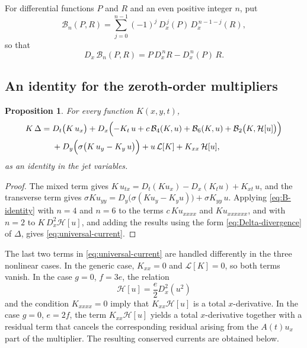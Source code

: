 \documentclass[11pt]{article}
\numberwithin{equation}{section}
\newtheorem{proposition}[theorem]{Proposition}
\theoremstyle{definition}
\theoremstyle{remark}
\begin{document}
For differential functions $P$ and $R$
and an even positive integer $n$, put
\begin{equation}
\mathcal{B}_n(P,R)
= \sum_{j=0}^{n-1} (-1)^j\,D_x^{\,j}(P)\,D_x^{\,n-1-j}(R),
\label{eq:B-def}
\end{equation}
so that
\begin{equation}
D_x\,\mathcal{B}_n(P,R)
=
P\,D_x^{\,n}R-D_x^{\,n}(P)\,R.
\label{eq:B-identity}
\end{equation}

\subsection{An identity for the zeroth-order multipliers}

\begin{proposition}
\label{prop:universal-current}
For every function $K(x,y,t)$,
\begin{equation}
\begin{aligned}
K\,\Delta
= {}& D_t\bigl(K\,u_x\bigr)
+ D_x\Bigl(
-K_t\,u
+ c\,\mathcal{B}_4(K,u)
+ \mathcal{B}_6(K,u)
+ \mathcal{B}_2\bigl(K,\mathcal{H}[u]\bigr)
\Bigr)
\\
&+ D_y\Bigl(\sigma\bigl(K\,u_y - K_y\,u\bigr)\Bigr)
+ u\,\mathcal{L}[K]
+ K_{xx}\,\mathcal{H}[u],
\end{aligned}
\label{eq:universal-current}
\end{equation}
as an identity in the jet variables.
\end{proposition}

\begin{proof}
The mixed term gives
$K\,u_{tx} = D_t(K u_x) - D_x(K_t u) + K_{xt}\,u$, and the
transverse term gives
$\sigma K u_{yy} = D_y\bigl(\sigma(K u_y - K_y u)\bigr)
+ \sigma K_{yy}\,u$. Applying \eqref{eq:B-identity} with $n=4$ and
$n=6$ to the terms $c\,K u_{xxxx}$ and $K u_{xxxxxx}$, and with $n=2$
to $K\,D_x^2\mathcal{H}[u]$, and adding the results using the form
\eqref{eq:Delta-divergence} of $\Delta$, gives
\eqref{eq:universal-current}.
\end{proof}

The last two terms in \eqref{eq:universal-current} are handled
differently in the three nonlinear cases. In the generic case,
$K_{xx}=0$ and $\mathcal{L}[K]=0$, so both terms vanish. In the case
$g=0$, $f=3e$, the relation
\[
\mathcal{H}[u]=\frac{e}{2}D_x^2(u^2)
\]
and the condition $K_{xxxx}=0$ imply that
$K_{xx}\mathcal{H}[u]$ is a total $x$-derivative. In the case
$g=0$, $e=2f$, the term $K_{xx}\mathcal{H}[u]$ yields a total
$x$-derivative together with a residual term that cancels the
corresponding residual arising from the $A(t)u_x$ part of the
multiplier. The resulting conserved currents are obtained below.
\end{document}
